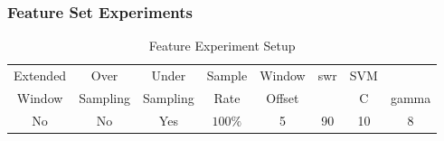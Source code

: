 




    
\subsubsection{Feature Set Experiments}
\label{sec:svm_feature_set_experiments}


\begin{table}[h]
\begin{center}

    \begin{tabular}{|c|c|c|c|c|c|cc|}
        \hline
        Extended & Over & Under & Sample & Window & \gls{swr} & SVM & \\
        Window & Sampling & Sampling & Rate & Offset &  & C & gamma \\ \hline
        No & No & Yes & $100\%$ & 5 & 90 & 10 & 8 \\ \hline
    \end{tabular}
    \caption{Feature Experiment Setup}
    \label{tab:svm_feature_experiment_setup}
\end{center}

\end{table}

